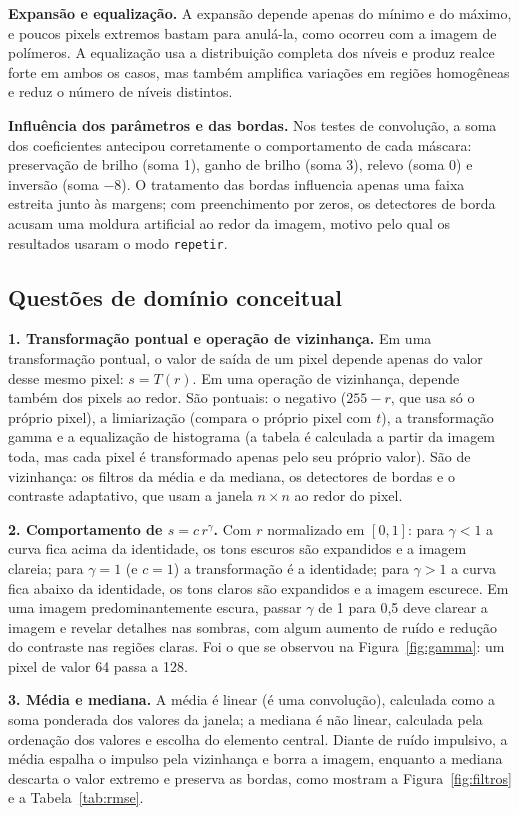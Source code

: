 \documentclass[11pt,a4paper]{article}
\begin{document}
\textbf{Expansão e equalização.} A expansão depende apenas do mínimo e do máximo, e poucos pixels extremos bastam para anulá-la, como ocorreu com a imagem de polímeros. A equalização usa a distribuição completa dos níveis e produz realce forte em ambos os casos, mas também amplifica variações em regiões homogêneas e reduz o número de níveis distintos.

\textbf{Influência dos parâmetros e das bordas.} Nos testes de convolução, a soma dos coeficientes antecipou corretamente o comportamento de cada máscara: preservação de brilho (soma 1), ganho de brilho (soma 3), relevo (soma 0) e inversão (soma $-8$). O tratamento das bordas influencia apenas uma faixa estreita junto às margens; com preenchimento por zeros, os detectores de borda acusam uma moldura artificial ao redor da imagem, motivo pelo qual os resultados usaram o modo \texttt{repetir}.

\subsection{Questões de domínio conceitual}

\textbf{1. Transformação pontual e operação de vizinhança.} Em uma transformação pontual, o valor de saída de um pixel depende apenas do valor desse mesmo pixel: $s=T(r)$. Em uma operação de vizinhança, depende também dos pixels ao redor. São pontuais: o negativo ($255-r$, que usa só o próprio pixel), a limiarização (compara o próprio pixel com $t$), a transformação gamma e a equalização de histograma (a tabela é calculada a partir da imagem toda, mas cada pixel é transformado apenas pelo seu próprio valor). São de vizinhança: os filtros da média e da mediana, os detectores de bordas e o contraste adaptativo, que usam a janela $n\times n$ ao redor do pixel.

\textbf{2. Comportamento de $s=c\,r^\gamma$.} Com $r$ normalizado em $[0,1]$: para $\gamma<1$ a curva fica acima da identidade, os tons escuros são expandidos e a imagem clareia; para $\gamma=1$ (e $c=1$) a transformação é a identidade; para $\gamma>1$ a curva fica abaixo da identidade, os tons claros são expandidos e a imagem escurece. Em uma imagem predominantemente escura, passar $\gamma$ de 1 para 0,5 deve clarear a imagem e revelar detalhes nas sombras, com algum aumento de ruído e redução do contraste nas regiões claras. Foi o que se observou na Figura~\ref{fig:gamma}: um pixel de valor 64 passa a 128.

\textbf{3. Média e mediana.} A média é linear (é uma convolução), calculada como a soma ponderada dos valores da janela; a mediana é não linear, calculada pela ordenação dos valores e escolha do elemento central. Diante de ruído impulsivo, a média espalha o impulso pela vizinhança e borra a imagem, enquanto a mediana descarta o valor extremo e preserva as bordas, como mostram a Figura~\ref{fig:filtros} e a Tabela~\ref{tab:rmse}.
\end{document}
